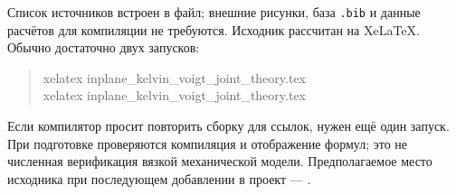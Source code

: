 \documentclass[11pt,a4paper]{article}
\numberwithin{equation}{section}
\begin{document}
Список источников встроен в файл; внешние рисунки, база \texttt{.bib}
и данные расчётов для компиляции не требуются. Исходник рассчитан на
XeLaTeX. Обычно достаточно двух запусков:
\begin{quote}\small\ttfamily
xelatex inplane\_kelvin\_voigt\_joint\_theory.tex\\
xelatex inplane\_kelvin\_voigt\_joint\_theory.tex
\end{quote}
Если компилятор просит повторить сборку для ссылок, нужен ещё один запуск.
При подготовке проверяются компиляция и отображение формул; это не
численная верификация вязкой механической модели. Предполагаемое место
исходника при последующем добавлении в проект ---
.

\begingroup
\raggedright
\renewcommand{\refname}{Источники}
\end{document}
